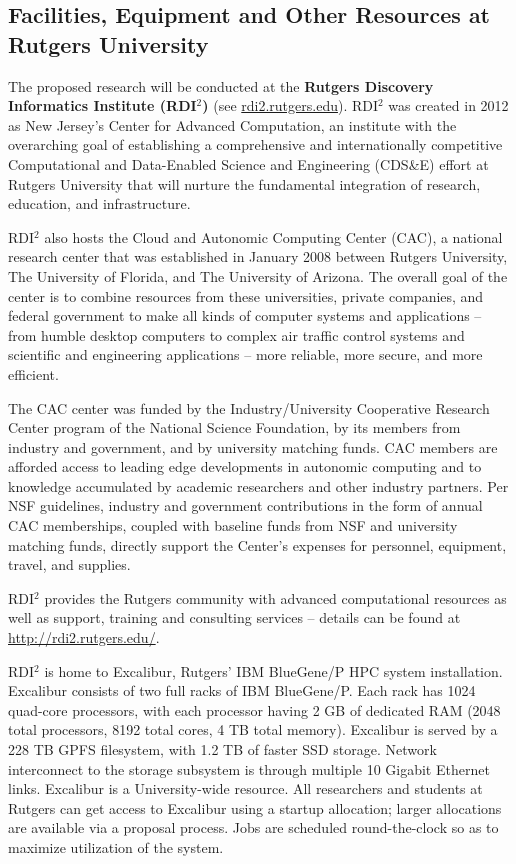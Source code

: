 \begin{center}
\section*{Facilities, Equipment and Other Resources at Rutgers University}
\end{center}

\noindent The proposed research will be conducted at the {\bf Rutgers Discovery Informatics Institute  (RDI$^2$)} (see \url{rdi2.rutgers.edu}). RDI$^2$ was created in 2012 as New Jersey's Center for Advanced Computation, an institute with the overarching goal of establishing a comprehensive and internationally competitive Computational and Data-Enabled Science and Engineering (CDS\&E) effort at Rutgers University that will nurture the fundamental integration of research, education, and infrastructure. 

RDI$^2$ also hosts the Cloud and Autonomic Computing Center (CAC), a national research center that was established in January 2008 between Rutgers University, The University of Florida, and The University of Arizona.  The overall goal of the center is to combine resources from these universities, private companies, and federal government to make all kinds of computer systems and applications -- from humble desktop computers to complex air traffic control systems and scientific and engineering applications -- more reliable, more secure, and more efficient. 

The CAC center was funded by the Industry/University Cooperative Research Center program of the National Science Foundation, by its members from industry and government, and by university matching funds. CAC members are afforded access to leading edge developments in autonomic computing and to knowledge accumulated by academic researchers and other industry partners. Per NSF guidelines, industry and government contributions in the form of annual CAC memberships, coupled with baseline funds from NSF and university matching funds, directly support the Center's expenses for personnel, equipment, travel, and supplies. 

RDI$^2$ provides the Rutgers community with advanced computational resources as well as support, training and consulting services -- details can be found at \url{http://rdi2.rutgers.edu/}.

RDI$^2$ is home to Excalibur, Rutgers' IBM BlueGene/P HPC system installation.  Excalibur consists of two full racks of IBM BlueGene/P.  Each rack has 1024 quad-core processors, with each processor having 2 GB of dedicated RAM (2048 total processors, 8192 total cores, 4 TB total memory).  Excalibur is served by a 228 TB GPFS filesystem, with 1.2 TB of faster SSD storage.  Network interconnect to the storage subsystem is through multiple 10 Gigabit Ethernet links.  Excalibur is a University-wide resource.  All researchers and students at Rutgers can get access to Excalibur using a startup allocation; larger allocations are available via a proposal process. Jobs are scheduled round-the-clock so as to maximize utilization of the system.  

